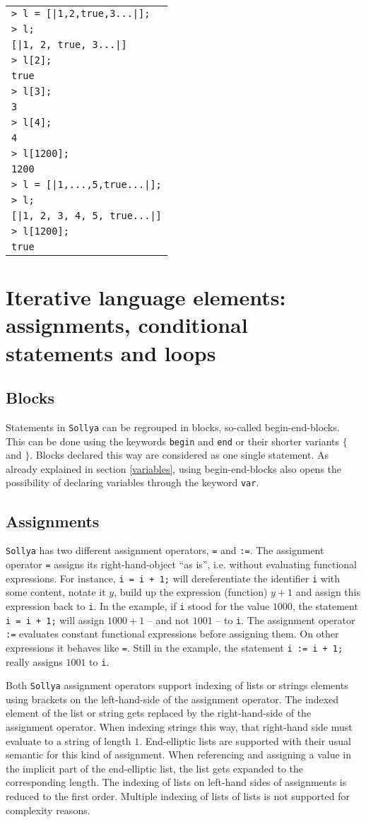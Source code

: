 \documentclass[a4paper]{article}
\newcommand{\key}[1]{\texttt{#1}}
\newcommand{\sollya}{\texttt{Sollya}\xspace}
\newcommand{\code}[1]{
\begin{center}
\begin{tabular}{|p{14.8cm}|}
\hline
#1
\hline
\end{tabular}
\end{center}
}
\newcommand{\ligne}[1]{\texttt{#1}\\}
\begin{document}
\code{
\ligne{> l = [|1,2,true,3...|];}
\ligne{> l;}
\ligne{[|1, 2, true, 3...|]}
\ligne{> l[2];}
\ligne{true}
\ligne{> l[3];}
\ligne{3}
\ligne{> l[4];}
\ligne{4}
\ligne{> l[1200];}
\ligne{1200}
\ligne{> l = [|1,...,5,true...|];}
\ligne{> l;}
\ligne{[|1, 2, 3, 4, 5, true...|]}
\ligne{> l[1200];}
\ligne{true}
}



\section{Iterative language elements: assignments, conditional statements and loops}

\subsection{Blocks}

Statements in \sollya can be regrouped in blocks, so-called
begin-end-blocks.  This can be done using the keywords \key{begin} and
\key{end} or their shorter variants \key{$\lbrace$} and
\key{$\rbrace$}. Blocks declared this way are considered as one single
statement. As already explained in section \ref{variables}, using
begin-end-blocks also opens the possibility of declaring variables
through the keyword \key{var}. 

\subsection{Assignments}

\sollya has two different assignment operators, \texttt{=} and
\texttt{:=}. The assignment operator \texttt{=} assigns its
right-hand-object ``as is'', i.e. without evaluating functional
expressions. For instance, \texttt{i = i + 1;} will dereferentiate the
identifier \texttt{i} with some content, notate it $y$, build up the
expression (function) $y + 1$ and assign this expression back to
\texttt{i}. In the example, if \texttt{i} stood for the value $1000$,
the statement \texttt{i = i + 1;} will assign $1000 + 1$ -- and not
$1001$ -- to \texttt{i}. The assignment operator \texttt{:=} evaluates
constant functional expressions before assigning them. On other
expressions it behaves like \texttt{=}. Still in the example, the
statement \texttt{i := i + 1;} really assigns $1001$ to \texttt{i}.

Both \sollya assignment operators support indexing of lists or strings
elements using brackets on the left-hand-side of the assignment
operator. The indexed element of the list or string gets replaced by
the right-hand-side of the assignment operator.  When indexing strings
this way, that right-hand side must evaluate to a string of length
$1$. End-elliptic lists are supported with their usual semantic for
this kind of assignment.  When referencing and assigning a value in
the implicit part of the end-elliptic list, the list gets expanded to
the corresponding length. The indexing of lists on left-hand sides of
assignments is reduced to the first order. Multiple indexing of lists
of lists is not supported for complexity reasons. 
\end{document}
